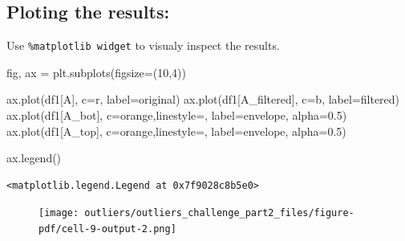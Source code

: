 \documentclass[
  letterpaper,
  DIV=11,
  numbers=noendperiod,
  oneside]{scrreprt}
\newenvironment{Shaded}{\begin{snugshade}}{\end{snugshade}}
\newcommand{\DecValTok}[1]{\textcolor[rgb]{0.68,0.00,0.00}{#1}}
\newcommand{\FloatTok}[1]{\textcolor[rgb]{0.68,0.00,0.00}{#1}}
\newcommand{\NormalTok}[1]{\textcolor[rgb]{0.00,0.23,0.31}{#1}}
\newcommand{\OperatorTok}[1]{\textcolor[rgb]{0.37,0.37,0.37}{#1}}
\newcommand{\StringTok}[1]{\textcolor[rgb]{0.13,0.47,0.30}{#1}}
\begin{document}
\hypertarget{ploting-the-results}{%
\subsection{Ploting the results:}\label{ploting-the-results}}

Use \texttt{\%matplotlib\ widget} to visualy inspect the results.

\begin{Shaded}
\begin{Highlighting}[]
\NormalTok{fig, ax }\OperatorTok{=}\NormalTok{ plt.subplots(figsize}\OperatorTok{=}\NormalTok{(}\DecValTok{10}\NormalTok{,}\DecValTok{4}\NormalTok{))}

\NormalTok{ax.plot(df1[}\StringTok{\textquotesingle{}A\textquotesingle{}}\NormalTok{], c}\OperatorTok{=}\StringTok{\textquotesingle{}r\textquotesingle{}}\NormalTok{, label}\OperatorTok{=}\StringTok{\textquotesingle{}original\textquotesingle{}}\NormalTok{)}
\NormalTok{ax.plot(df1[}\StringTok{\textquotesingle{}A\_filtered\textquotesingle{}}\NormalTok{], c}\OperatorTok{=}\StringTok{\textquotesingle{}b\textquotesingle{}}\NormalTok{, label}\OperatorTok{=}\StringTok{\textquotesingle{}filtered\textquotesingle{}}\NormalTok{)}
\NormalTok{ax.plot(df1[}\StringTok{\textquotesingle{}A\_bot\textquotesingle{}}\NormalTok{], c}\OperatorTok{=}\StringTok{\textquotesingle{}orange\textquotesingle{}}\NormalTok{,linestyle}\OperatorTok{=}\StringTok{\textquotesingle{}{-}{-}\textquotesingle{}}\NormalTok{, label}\OperatorTok{=}\StringTok{\textquotesingle{}envelope\textquotesingle{}}\NormalTok{, alpha}\OperatorTok{=}\FloatTok{0.5}\NormalTok{)}
\NormalTok{ax.plot(df1[}\StringTok{\textquotesingle{}A\_top\textquotesingle{}}\NormalTok{], c}\OperatorTok{=}\StringTok{\textquotesingle{}orange\textquotesingle{}}\NormalTok{,linestyle}\OperatorTok{=}\StringTok{\textquotesingle{}{-}{-}\textquotesingle{}}\NormalTok{, label}\OperatorTok{=}\StringTok{\textquotesingle{}envelope\textquotesingle{}}\NormalTok{, alpha}\OperatorTok{=}\FloatTok{0.5}\NormalTok{)}

\NormalTok{ax.legend()}
\end{Highlighting}
\end{Shaded}

\begin{verbatim}
<matplotlib.legend.Legend at 0x7f9028c8b5e0>
\end{verbatim}

\begin{figure}[H]

{\centering \texttt{[image: outliers/outliers\_challenge\_part2\_files/figure-pdf/cell-9-output-2.png]}

}

\end{figure}
\end{document}
